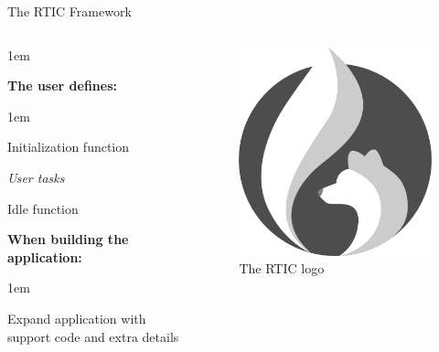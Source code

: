 \begin{frame}{The RTIC Framework}
    \begin{columns}
        \begin{itemize-size}{1em}
            \item \textbf{The user defines:}
            \begin{itemize-size}{1em}
                \item Initialization function
                \item \emph{User tasks}
                \item Idle function
            \end{itemize-size}
            \item \textbf{When building the application:}
            \begin{itemize-size}{1em}
                \item Expand application with support code
                and extra details
            \end{itemize-size}
        \end{itemize-size}

        \begin{figure}
            \centering
            \includegraphics[scale=0.35]{pictures/RTIC.png}
            \caption{The RTIC logo}
        \end{figure}
    \end{columns}
\end{frame}

